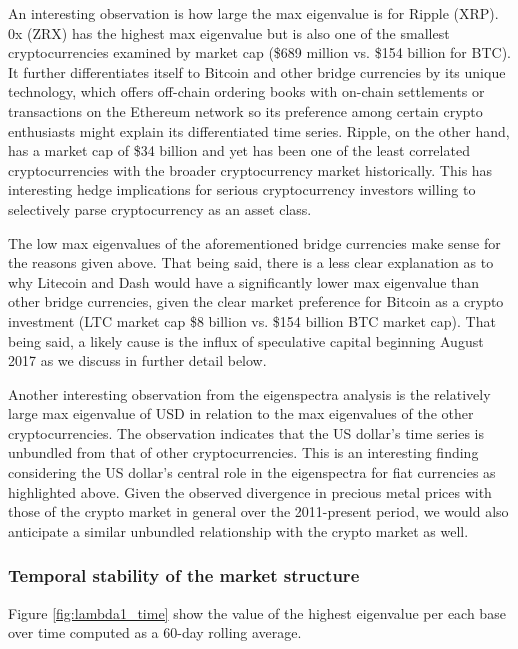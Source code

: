 \documentclass[a4paper]{article}
\begin{document}
\begin{multicols}{2}

An interesting observation is how large the max eigenvalue is for Ripple (XRP). 0x (ZRX) has the highest max eigenvalue but is also one of the smallest cryptocurrencies examined by market cap (\$689 million vs. \$154 billion for BTC). It further differentiates itself to Bitcoin and other bridge currencies by its unique technology, which offers off-chain ordering books with on-chain settlements or transactions on the Ethereum network so its preference among certain crypto enthusiasts might explain its differentiated time series. Ripple, on the other hand, has a market cap of \$34 billion and yet has been one of the least correlated cryptocurrencies with the broader cryptocurrency market historically. This has interesting hedge implications for serious cryptocurrency investors willing to selectively parse cryptocurrency as an asset class. 

The low max eigenvalues of the aforementioned bridge currencies make sense for the reasons given above. That being said, there is a less clear explanation as to why Litecoin and Dash would have a significantly lower max eigenvalue than other bridge currencies, given the clear market preference for Bitcoin as a crypto investment (LTC market cap \$8 billion vs. \$154 billion BTC market cap). That being said, a likely cause is the influx of speculative capital beginning August 2017 as we discuss in further detail below.

Another interesting observation from the eigenspectra analysis is the relatively large max eigenvalue of USD in relation to the max eigenvalues of the other cryptocurrencies. The observation indicates that the US dollar’s time series is unbundled from that of other cryptocurrencies. This is an interesting finding considering the US dollar’s central role in the eigenspectra for fiat currencies as highlighted above. Given the observed divergence in precious metal prices with those of the crypto market in general over the 2011-present period, we would also anticipate a similar unbundled relationship with the crypto market as well. 

\subsubsection{Temporal stability of the market structure}
Figure \ref{fig:lambda1_time} show the value of the highest eigenvalue per each base over time computed as a 60-day rolling average.
\end{multicols}
\end{document}

